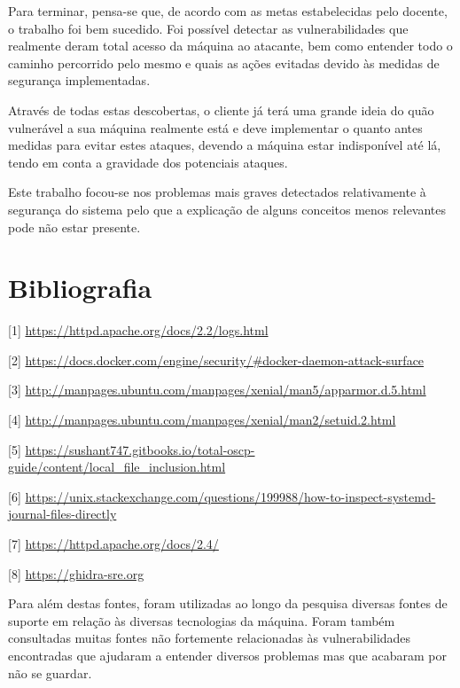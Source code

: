 \documentclass[10pt,english]{article}
\begin{document}
\par Para terminar, pensa-se que, de acordo com as metas estabelecidas pelo docente, o trabalho foi bem sucedido. Foi possível detectar as vulnerabilidades que realmente deram total acesso da máquina ao atacante, bem como entender todo o caminho percorrido pelo mesmo e quais as ações evitadas devido às medidas de segurança implementadas.

\par Através de todas estas descobertas, o cliente já terá uma grande ideia do quão vulnerável a sua máquina realmente está e deve implementar o quanto antes medidas para evitar estes ataques, devendo a máquina estar indisponível até lá, tendo em conta a gravidade dos potenciais ataques.

\par Este trabalho focou-se nos problemas mais graves detectados relativamente à segurança do sistema pelo que a explicação de alguns conceitos menos relevantes pode não estar presente.

\clearpage

\section{Bibliografia}





\vspace{5mm} %

[1] \url{https://httpd.apache.org/docs/2.2/logs.html}

[2] \url{https://docs.docker.com/engine/security/#docker-daemon-attack-surface}

[3] \url{http://manpages.ubuntu.com/manpages/xenial/man5/apparmor.d.5.html}

[4] \url{http://manpages.ubuntu.com/manpages/xenial/man2/setuid.2.html}

[5] \url{https://sushant747.gitbooks.io/total-oscp-guide/content/local_file_inclusion.html}

[6] \url{https://unix.stackexchange.com/questions/199988/how-to-inspect-systemd-journal-files-directly}

[7] \url{https://httpd.apache.org/docs/2.4/}

[8] \url{https://ghidra-sre.org}

\par Para além destas fontes, foram utilizadas ao longo da pesquisa diversas fontes de suporte em relação às diversas tecnologias da máquina. Foram também consultadas muitas fontes não fortemente relacionadas às vulnerabilidades encontradas que ajudaram a entender diversos problemas mas que acabaram por não se guardar.
\end{document}
